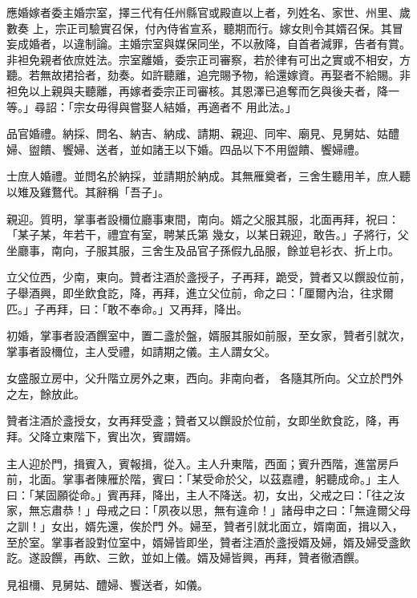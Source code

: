 \begin{pinyinscope}
 應婚嫁者委主婚宗室，擇三代有任州縣官或殿直以上者，列姓名、家世、州里、歲數奏
 上，宗正司驗實召保，付內侍省宣系，聽期而行。嫁女則令其婿召保。其冒妄成婚者，以違制論。主婚宗室與媒保同坐，不以赦降，自首者減罪，告者有賞。非袒免親者依庶姓法。宗室離婚，委宗正司審察，若於律有可出之實或不相安，方聽。若無故捃拾者，劾奏。如許聽離，追完賜予物，給還嫁資。再娶者不給賜。非袒免以上親與夫聽離，再嫁者委宗正司審核。其恩澤已追奪而乞與後夫者，降一等。」尋詔：「宗女毋得與嘗娶人結婚，再適者不
 用此法。」



 品官婚禮。納採、問名、納吉、納成、請期、親迎、同牢、廟見、見舅姑、姑醴婦、盥饋、饗婦、送者，並如諸王以下婚。四品以下不用盥饋、饗婦禮。



 士庶人婚禮。並問名於納採，並請期於納成。其無雁奠者，三舍生聽用羊，庶人聽以雉及雞鶩代。其辭稱「吾子」。



 親迎。質明，掌事者設檷位廳事東間，南向。婿之父服其服，北面再拜，祝曰：「某子某，年若干，禮宜有室，聘某氏第
 幾女，以某日親迎，敢告。」子將行，父坐廳事，南向，子服其服，三舍生及品官子孫假九品服，餘並皂衫衣、折上巾。



 立父位西，少南，東向。贊者注酒於盞授子，子再拜，跪受，贊者又以饌設位前，子舉酒興，即坐飲食訖，降，再拜，進立父位前，命之曰：「厘爾內治，往求爾匹。」子再拜，曰：「敢不奉命。」又再拜，降出。



 初婚，掌事者設酒饌室中，置二盞於盤，婿服其服如前服，至女家，贊者引就次，掌事者設檷位，主人受禮，如請期之儀。主人謂女父。



 女盛服立房中，父升階立房外之東，西向。非南向者，
 各隨其所向。父立於門外之左，餘放此。



 贊者注酒於盞授女，女再拜受盞；贊者又以饌設於位前，女即坐飲食訖，降，再拜。父降立東階下，賓出次，賓謂婿。



 主人迎於門，揖賓入，賓報揖，從入。主人升東階，西面；賓升西階，進當房戶前，北面。掌事者陳雁於階，賓曰：「某受命於父，以茲嘉禮，躬聽成命。」主人曰：「某固願從命。」賓再拜，降出，主人不降送。初，女出，父戒之曰：「往之汝家，無忘肅恭！」母戒之曰：「夙夜以思，無有違命！」諸母申之曰：「無違爾父母之訓！」女出，婿先還，俟於門
 外。婦至，贊者引就北面立，婿南面，揖以入，至於室。掌事者設對位室中，婿婦皆即坐，贊者注酒於盞授婿及婦，婿及婦受盞飲訖。遂設饌，再飲、三飲，並如上儀。婿及婦皆興，再拜，贊者徹酒饌。



 見祖檷、見舅姑、醴婦、饗送者，如儀。



\end{pinyinscope}